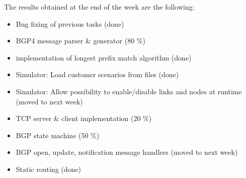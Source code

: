 The results obtained at the end of the week are the following:

\begin{itemize}
    \item Bug fixing of previous tasks (done)
    \item BGP4 message parser \& generator (80 \%)
    \item implementation of longest prefix match algorithm (done)
    \item Simulator: Load customer scenarios from files (done)
    \item Simulator: Allow possibility to enable/disable links and nodes at runtime (moved to next week)
    \item TCP server \& client implementation (20 \%)
    \item BGP state machine (50 \%)
    \item BGP open, update, notification message handlers (moved to next week)
    \item Static routing (done)
\end{itemize}

